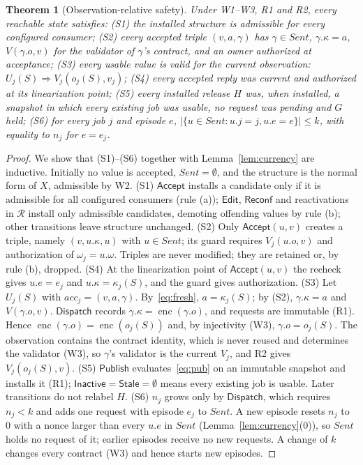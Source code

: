 \documentclass[pdflatex,sn-mathphys-num]{sn-jnl}
\theoremstyle{thmstyleone}%
\newtheorem{theorem}{Theorem}%
\theoremstyle{thmstyletwo}%
\theoremstyle{thmstylethree}%
\newcommand{\key}{\kappa}
\newcommand{\enc}{\operatorname{enc}}
\newcommand{\Stale}{\mathsf{Stale}}
\newcommand{\Inact}{\mathsf{Inactive}}
\newcommand{\Sent}{\mathit{Sent}}
\newcommand{\Acc}{\mathsf{Accept}}
\newcommand{\Disp}{\mathsf{Dispatch}}
\begin{document}
\begin{theorem}[Observation-relative safety]\label{thm:safety}
Under W1--W3, R1 and R2, every reachable state satisfies:
(S1) the installed structure is admissible for every configured consumer;
(S2) every accepted triple $(v,a,\gamma)$ has $\gamma\in\Sent$, $\gamma.\key=a$, $V(\gamma.o,v)$ for the validator of $\gamma$'s contract, and an owner authorized at acceptance;
(S3) every usable value is valid for the current observation: $U_j(S)\Rightarrow V_j(o_j(S),v_j)$;
(S4) every accepted reply was current and authorized at its linearization point;
(S5) every installed release $H$ was, when installed, a snapshot in which every existing job was usable, no request was pending and $G$ held;
(S6) for every job $j$ and episode $e$, $|\{u\in\Sent:u.j=j,u.e=e\}|\le k$, with equality to $n_j$ for $e=e_j$.
\end{theorem}
\begin{proof}
We show that (S1)--(S6) together with Lemma~\ref{lem:currency} are inductive. Initially no value is accepted, $\Sent=\emptyset$, and the structure is the normal form of $X$, admissible by W2.
(S1) $\Acc$ installs a candidate only if it is admissible for all configured consumers (rule (a)); $\mathsf{Edit}$, $\mathsf{Reconf}$ and reactivations in $\mathcal R$ install only admissible candidates, demoting offending values by rule (b); other transitions leave structure unchanged.
(S2) Only $\Acc(u,v)$ creates a triple, namely $(v,u.\key,u)$ with $u\in\Sent$; its guard requires $V_j(u.o,v)$ and authorization of $\omega_j=u.\omega$. Triples are never modified; they are retained or, by rule (b), dropped.
(S4) At the linearization point of $\Acc(u,v)$ the recheck gives $u.e=e_j$ and $u.\key=\key_j(S)$, and the guard gives authorization.
(S3) Let $U_j(S)$ with $\mathit{acc}_j=(v,a,\gamma)$. By~\eqref{eq:fresh}, $a=\key_j(S)$; by (S2), $\gamma.\key=a$ and $V(\gamma.o,v)$. $\Disp$ records $\gamma.\key=\enc(\gamma.o)$, and requests are immutable (R1). Hence $\enc(\gamma.o)=\enc(o_j(S))$ and, by injectivity (W3), $\gamma.o=o_j(S)$. The observation contains the contract identity, which is never reused and determines the validator (W3), so $\gamma$'s validator is the current $V_j$, and R2 gives $V_j(o_j(S),v)$.
(S5) $\mathsf{Publish}$ evaluates~\eqref{eq:pub} on an immutable snapshot and installs it (R1); $\Inact=\Stale=\emptyset$ means every existing job is usable. Later transitions do not relabel $H$.
(S6) $n_j$ grows only by $\Disp$, which requires $n_j<k$ and adds one request with episode $e_j$ to $\Sent$. A new episode resets $n_j$ to $0$ with a nonce larger than every $u.e$ in $\Sent$ (Lemma~\ref{lem:currency}(0)), so $\Sent$ holds no request of it; earlier episodes receive no new requests. A change of $k$ changes every contract (W3) and hence starts new episodes.
\end{proof}
\end{document}
